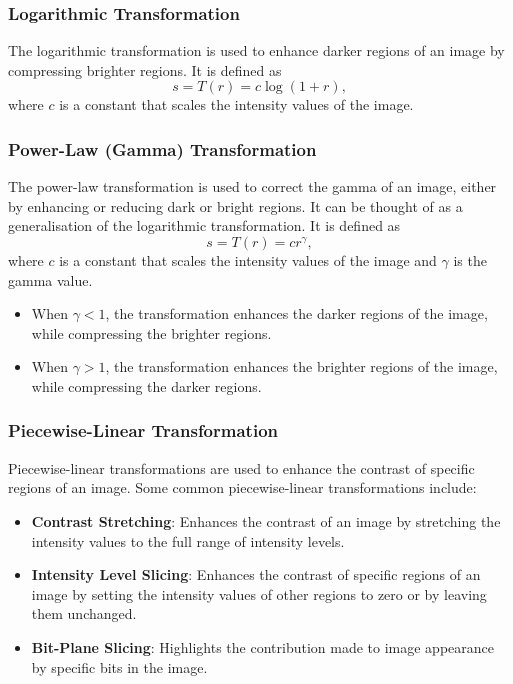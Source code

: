 \documentclass{article}
\begin{document}
\subsubsection{Logarithmic Transformation}
The logarithmic transformation is used to enhance darker regions of an
image by compressing brighter regions. It is defined as
\begin{equation*}
    s = T\left( r \right) = c \log{\left( 1 + r \right)},
\end{equation*}
where \(c\) is a constant that scales the intensity values of the image.
\subsubsection{Power-Law (Gamma) Transformation}
The power-law transformation is used to correct the gamma of an image,
either by enhancing or reducing dark or bright regions. It can be
thought of as a generalisation of the logarithmic transformation. It is
defined as
\begin{equation*}
    s = T\left( r \right) = c r^\gamma,
\end{equation*}
where \(c\) is a constant that scales the intensity values of the image
and \(\gamma\) is the gamma value.
\begin{itemize}
    \item When \(\gamma < 1\), the transformation enhances the darker
          regions of the image, while compressing the brighter regions.
    \item When \(\gamma > 1\), the transformation enhances the brighter
          regions of the image, while compressing the darker regions.
\end{itemize}
\subsubsection{Piecewise-Linear Transformation}
Piecewise-linear transformations are used to enhance the contrast of
specific regions of an image. Some common piecewise-linear
transformations include:
\begin{itemize}
    \item \textbf{Contrast Stretching}: Enhances the contrast of an
          image by stretching the intensity values to the full range of
          intensity levels.
    \item \textbf{Intensity Level Slicing}: Enhances the contrast of
          specific regions of an image by setting the intensity values
          of other regions to zero or by leaving them unchanged.
    \item \textbf{Bit-Plane Slicing}: Highlights the contribution made
          to image appearance by specific bits in the image.
\end{itemize}
\end{document}
